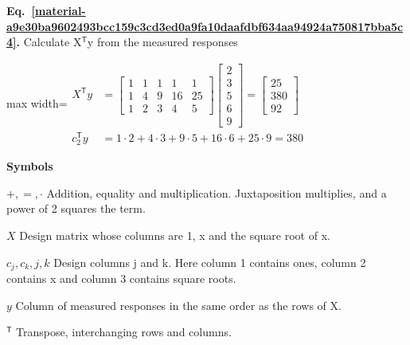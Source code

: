 \documentclass[11pt,a4paper]{article}
\begin{document}
\par\medskip
\noindent\begin{minipage}{\linewidth}
\label{material-a9e30ba9602493bcc159c3cd3ed0a9fa10daafdbf634aa94924a750817bba5c4}
\noindent\textbf{Eq.~\ref*{material-a9e30ba9602493bcc159c3cd3ed0a9fa10daafdbf634aa94924a750817bba5c4}.} Calculate X\ensuremath{{}^{\mathsf T}}y from the measured responses\par\nopagebreak
\begin{center}\begin{adjustbox}{max width=\linewidth}$\displaystyle \begin{aligned}X^{\mathsf T}y&=\begin{bmatrix}1&1&1&1&1\\1&4&9&16&25\\1&2&3&4&5\end{bmatrix}\begin{bmatrix}2\\3\\5\\6\\9\end{bmatrix}=\begin{bmatrix}25\\380\\92\end{bmatrix}\\[.6em]c_2^{\mathsf T}y&=1\cdot2+4\cdot3+9\cdot5+16\cdot6+25\cdot9=380\end{aligned}$\end{adjustbox}\end{center}

\par\noindent\textbf{Symbols}

\par\noindent\textbf{\(+,=,\cdot\)} Addition, equality and multiplication. Juxtaposition multiplies, and a power of 2 squares the term.

\par\noindent\textbf{\(X\)} Design matrix whose columns are 1, x and the square root of x.

\par\noindent\textbf{\(c_j,c_k,j,k\)} Design columns j and k. Here column 1 contains ones, column 2 contains x and column 3 contains square roots.

\par\noindent\textbf{\(y\)} Column of measured responses in the same order as the rows of X.

\par\noindent\textbf{\({}^{\mathsf T}\)} Transpose, interchanging rows and columns.

\end{minipage}\par
\medskip
\end{document}
